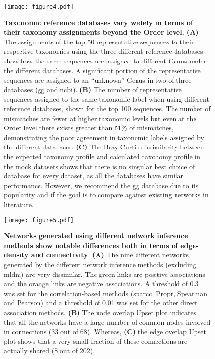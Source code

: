   \begin{figure}[H]
    \centering
    \texttt{[image: figure4.pdf]}
  \end{figure}
  \begin{figure}[H]
    \centering
    \caption{
      \textbf{Taxonomic reference databases vary widely in terms of their taxonomy assignments beyond the Order level.}
      \textbf{(A)} The assignments of the top 50 representative sequences to their respective taxonomies using the three different reference databases show how the same sequences are assigned to different Genus under the different databases.
      A significant portion of the representative sequences are assigned to an ``unknown'' Genus in two of three databases (\ac{gg} and \ac{ncbi}).
      \textbf{(B)} The number of representative sequences assigned to the same taxonomic label when using different reference databases, shown for the top 100 sequences.
      The number of mismatches are fewer at higher taxonomic levels but even at the Order level there exists greater than 51\% of mismatches, demonstrating the poor agreement in taxonomic labels assigned by the different databases.
      \textbf{(C)} The Bray-Curtis dissimilarity between the expected taxonomy profile and calculated taxonomy profile in the mock datasets shows that there is no singular best choice of database for every dataset, as all the databases have similar performance.
      However, we recommend the \ac{gg} database due to its popularity and if the goal is to compare against existing networks in literature.
    }
    \label{fig:figure4}
  \end{figure}
  \FloatBarrier
  \newpage


  \begin{figure}[H]
    \centering
    \texttt{[image: figure5.pdf]}
  \end{figure}
  \begin{figure}[H]
    \centering
    \caption{
      \textbf{Networks generated using different network inference methods show notable differences both in terms of edge-density and connectivity}.
      \textbf{(A)} The nine different networks generated by the different network inference methods (excluding \ac{mldm}) are very dissimilar.
      The green links are positive associations and the orange links are negative associations.
      A threshold of 0.3 was set for the correlation-based methods (\ac{sparcc}, Propr, Spearman and Pearson) and a threshold of 0.01 was set for the other direct association methods.
      \textbf{(B)} The node overlap Upset plot indicates that all the networks have a large number of common nodes involved in connections (33 out of 68).
      Whereas, \textbf{(C)} the edge overlap Upset plot shows that a very small fraction of these connections are actually shared (8 out of 202).
    }
    \label{fig:figure5}
  \end{figure}
  \FloatBarrier
  \newpage

